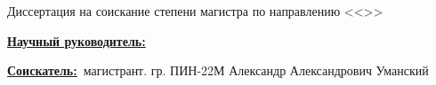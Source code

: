 \begin{frame}
\frametitle{\textbf{\thesisTitle}}

    \begin{center}
    Диссертация на соискание степени магистра по направлению \thesisSpecialtyNumber <<\thesisSpecialtyTitle>>
    \end{center}

    \underline{\textbf{Научный руководитель:}}~\supervisorRegaliaShort~\supervisorFioShort

    \underline{\textbf{Соискатель:}}~магистрант. гр. ПИН-22М Александр Александрович Уманский


\end{frame}
